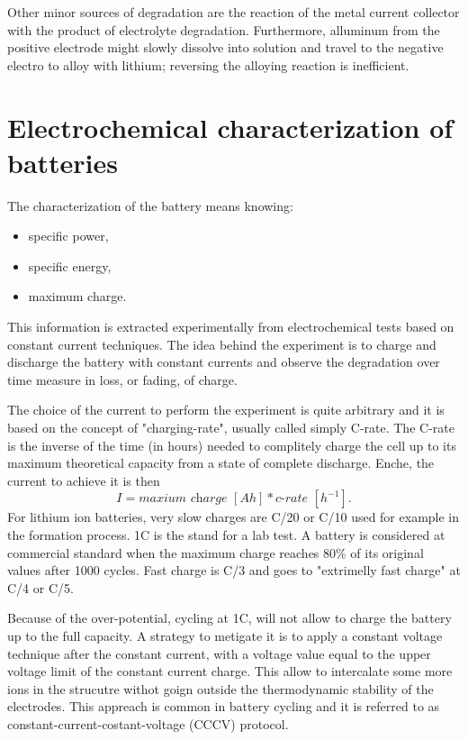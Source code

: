 Other minor sources of degradation are the reaction of the metal current collector with the product of electrolyte degradation. Furthermore, alluminum from the positive electrode might slowly dissolve into solution and travel to the negative electro to alloy with lithium; reversing the alloying reaction is inefficient.

\section{Electrochemical characterization of batteries}

The characterization of the battery means knowing:
\begin{itemize}
    \item specific power, 
    \item specific energy, 
    \item maximum charge.
\end{itemize}

This information is extracted experimentally from electrochemical tests based on constant current techniques. The idea behind the experiment is to charge and discharge the battery with constant currents and observe the degradation over time measure in loss, or fading, of charge. 

The choice of the current to perform the experiment is quite arbitrary and it is based on the concept of "charging-rate", usually called simply C-rate. The C-rate is the inverse of the time (in hours) needed to complitely charge the cell up to its maximum theoretical capacity from a state of complete discharge. Enche, the current to achieve it is then 
$$I=\textit{maxium charge } [Ah] * \textit{c-rate }[h^{-1}].$$ 
For lithium ion batteries, very slow charges are C/20 or C/10 used for example in the formation process. 1C is the stand for a lab test. A battery is considered at commercial standard when the maximum charge reaches 80\% of its original values after 1000 cycles. Fast charge is C/3 and goes to "extrimelly fast charge" at C/4 or C/5.

Because of the over-potential, cycling at 1C, will not allow to charge the battery up to the full capacity. A strategy to metigate it is to apply a constant voltage technique after the constant current, with a voltage value equal to the upper voltage limit of the constant current charge. This allow to intercalate some more ions in the strucutre withot goign outside the thermodynamic stability of the electrodes.
This appreach is common in battery cycling and it is referred to as constant-current-costant-voltage (CCCV) protocol.

